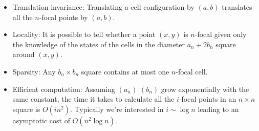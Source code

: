 \documentclass{article}
\theoremstyle{definition}
\begin{document}
\begin{itemize}
\item Translation invariance: Translating a cell configuration by $(a, b)$
translates all the $n$-focal points by $(a, b)$.

\item Locality: It is possible to tell whether a point $(x, y)$ is $n$-focal
given only the knowledge of the states of the cells in the diameter $a_n + 2
b_n$ square around $(x, y)$.

\item Sparsity: Any $b_n \times b_n$ square contains at most one $n$-focal cell.

\item Efficient computation: Assuming $(a_n)$ $(b_n)$ grow exponentially with
the same constant, the time it takes to calculate all the $i$-focal points in an
$n \times n$ square is $O (i n^2)$. Typically we're interested in $i \sim \log
n$ leading to an asymptotic cost of $O (n^2 \log n)$.
\end{itemize}
\end{document}
